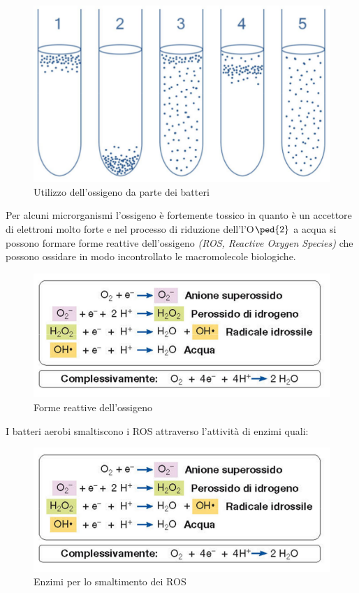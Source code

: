 \documentclass[11pt]{book}
\begin{document}
\begin{figure}[htp]
\centering
\includegraphics[scale=0.5]{img/Utilizzo ossigeno.png}
\caption{Utilizzo dell'ossigeno da parte dei batteri}
\label{}
\end{figure}

Per alcuni microrganismi l’ossigeno è fortemente tossico in quanto è un accettore di elettroni molto forte e nel processo di riduzione dell’l'O$\ped{2}$ a acqua si possono formare forme reattive dell’ossigeno \emph{(ROS, Reactive Oxygen Species)} che possono ossidare in modo incontrollato le macromolecole biologiche.

\clearpage
\begin{figure}[htp]
\centering
\includegraphics[scale=0.5]{img/ROS.png}
\caption{Forme reattive dell'ossigeno}
\label{}
\end{figure}
 
I batteri aerobi smaltiscono i ROS attraverso l’attività di enzimi quali:

\begin{figure}[htp]
\centering
\includegraphics[scale=0.5]{img/ROS.png}
\caption{Enzimi per lo smaltimento dei ROS}
\label{}
\end{figure}
\end{document}
